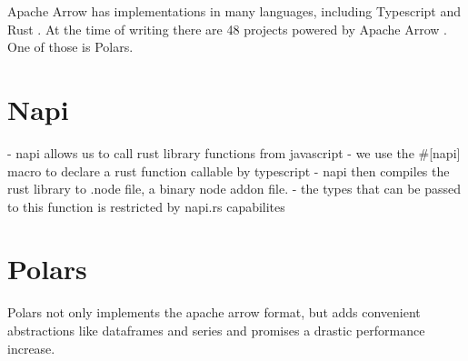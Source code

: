 Apache Arrow has implementations in many languages, including Typescript and Rust \autocite{arrow:status}.
At the time of writing there are 48 projects powered by Apache Arrow \autocite{arrow:projects}.
One of those is Polars.


\section{Napi}
- napi allows us to call rust library functions from javascript
- we use the #[napi] macro to declare a rust function callable by typescript
- napi then compiles the rust library to .node file, a binary node addon file.
- the types that can be passed to this function is restricted by napi.rs capabilites


\section{Polars}
\label{section:polars}
Polars not only implements the apache arrow format, but adds convenient abstractions like dataframes and series and promises a drastic performance increase.

